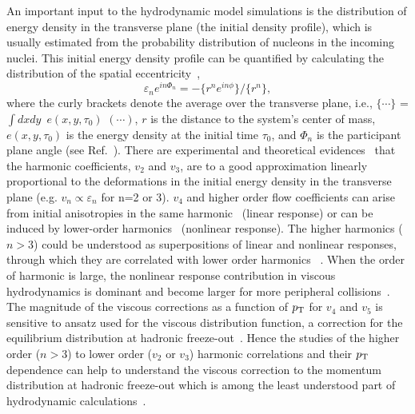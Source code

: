 An important input to the hydrodynamic model simulations is the distribution of energy density in the transverse plane (the initial density profile), which is usually estimated from the probability distribution of nucleons in the incoming nuclei.
This initial energy density profile can be quantified by calculating the distribution of the spatial eccentricity~\cite{Alver:2010gr},
\begin{equation}
 \varepsilon_{n} e^{in\Phi_{n}} = -\{r^n e^{in\phi}\}/ \{r^n\},
  \label{eq:eccentricities}
\end{equation}
where the curly brackets denote the average over the transverse plane, i.e., $\{\cdots\}$ = $\int dxdy$\, $e(x,y,\tau_0)$ $(\cdots)$, $r$ is the distance to the system's center of mass, $e(x,y,\tau_0)$ is the energy density at the initial time $\tau_0$, and $\Phi_{n}$ is the participant plane angle (see Ref.~\cite{Teaney:2010vd,Niemi:2015qia}).
There are experimental and theoretical evidences~\cite{Alver:2010gr,Qiu:2011iv,ALICE:2011ab} that the harmonic coefficients, $v_2$ and $v_3$, are to a good approximation linearly proportional to the deformations in the initial energy density in the transverse plane (e.g. $v_n \propto \varepsilon_n$ for n=2 or 3).
$v_4$ and higher order flow coefficients can arise from initial anisotropies in the same harmonic~\cite{Alver:2010gr,Teaney:2010vd,Gubser:2010ui,Hatta:2014jva} (linear response) or can be induced by lower-order harmonics~\cite{Bravina:2013xla,Bravina:2013ora} (nonlinear response).
The higher harmonics ($n>3$) could be understood as superpositions of linear and nonlinear responses, through which they are correlated with lower order harmonics ~\cite{Teaney:2012ke,Bravina:2013ora,Gubser:2010ui,Hatta:2014jva}. When the order of harmonic is large, the nonlinear response contribution in viscous hydrodynamics is dominant and become larger for more peripheral collisions~\cite{Teaney:2012ke,Bravina:2013ora}.
The magnitude of the viscous corrections as a function of $p_{\rm T}$ for $v_4$ and $v_5$ is sensitive to ansatz used for the viscous distribution function, a correction for the equilibrium distribution at hadronic freeze-out~\cite{Luzum:2010ad,Teaney:2012ke}.
Hence the studies of the higher order ($n>3$) to lower order ($v_2$ or $v_3$) harmonic correlations and their $p_{\rm T}$ dependence can help to understand the viscous correction to the momentum distribution at hadronic freeze-out which is among the least understood part of hydrodynamic calculations~\cite{Teaney:2012ke,Niemi:2015qia}.

